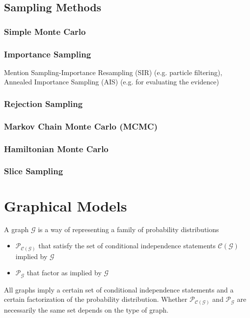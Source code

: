 \documentclass[a4paper]{article}
\begin{document}
\subsection{Sampling Methods}
\subsubsection{Simple Monte Carlo}
\subsubsection{Importance Sampling}
Mention Sampling-Importance Resampling (SIR) (e.g. particle filtering), Annealed Importance Sampling (AIS) (e.g. for evaluating the evidence)
\subsubsection{Rejection Sampling}
\subsubsection{Markov Chain Monte Carlo (MCMC)}
\subsubsection{Hamiltonian Monte Carlo}
\subsubsection{Slice Sampling}

\section{Graphical Models}
A graph $\mathcal{G}$ is a way of representing a family of probability distributions
\begin{itemize}
\item $\mathcal{P}_{\mathcal{C}(\mathcal{G})}$ that satisfy the set of conditional independence statements $\mathcal{C}(\mathcal{G})$ implied by $\mathcal{G}$
\item $\mathcal{P}_\mathcal{G}$ that factor as implied by $\mathcal{G}$
\end{itemize}
All graphs imply a certain set of conditional independence statements and a certain factorization of the probability distribution. Whether $\mathcal{P}_{\mathcal{C}(\mathcal{G})}$ and $\mathcal{P}_\mathcal{G}$ are necessarily the same set depends on the type of graph.
\end{document}
